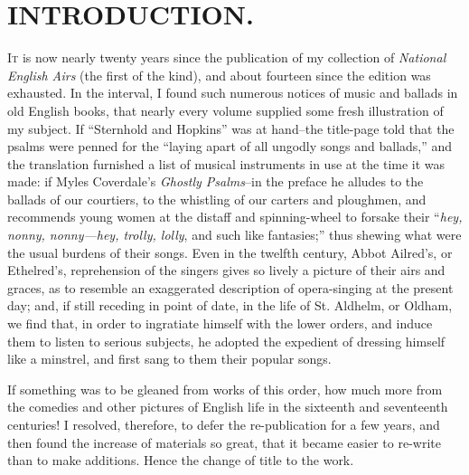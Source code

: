 
\intentionalemptypage


\chapter{INTRODUCTION.}
\vspace*{\fill}

\hspace*{\parindent}\textsc{It} is now nearly twenty years since the publication of my collection of 
\textit{National English Airs} (the first of the kind), and about fourteen since the edition
was exhausted. In the interval, I found such numerous notices of music and
ballads in old English books, that nearly every volume supplied some fresh
illustration of my subject. If “Sternhold and Hopkins” was at hand--the
title-page told that the psalms were penned for the “laying apart of all
ungodly songs and ballads,” and the translation furnished a list of musical
instruments in use at the time it was made: if Myles Coverdale’s \textit{Ghostly
Psalms}--in the preface he alludes to the ballads of our courtiers, to the
whistling of our carters and ploughmen, and recommends young women at the
distaff and spinning-wheel to forsake their “\textit{hey, nonny, nonny---hey, trolly, lolly},
and such like fantasies;” thus shewing what were the usual burdens of their
songs. Even in the twelfth century, Abbot Ailred’s, or Ethelred’s, reprehension
of the singers gives so lively a picture of their airs and graces, as to resemble an
exaggerated description of opera-singing at the present day; and, if still receding
in point of date, in the life of St. Aldhelm, or Oldham, we find that, in order to
ingratiate himself with the lower orders, and induce them to listen to serious
subjects, he adopted the expedient of dressing himself like a minstrel, and first
sang to them their popular songs.

If something was to be gleaned from works of this order, how much more from
the comedies and other pictures of English life in the sixteenth and seventeenth
centuries! I resolved, therefore, to defer the re-publication for a few years, and
then found the increase of materials so great, that it became easier to re-write than
to make additions. Hence the change of title to the work.


